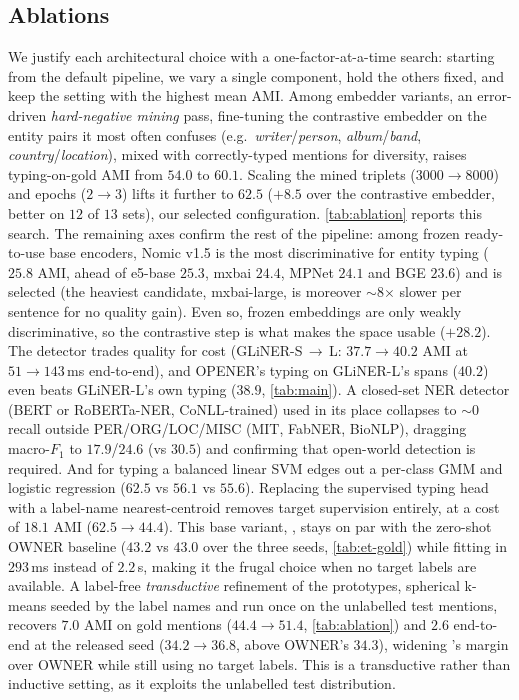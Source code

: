 \subsection{Ablations}
\label{sec:exp:ablations}
We justify each architectural choice with a one-factor-at-a-time search: starting from the default pipeline, we vary a single component, hold the others fixed, and keep the setting with the highest mean AMI.
Among embedder variants, an error-driven \emph{hard-negative mining} pass, fine-tuning the contrastive embedder on the entity pairs it most often confuses (e.g.\ \emph{writer}/\emph{person}, \emph{album}/\emph{band}, \emph{country}/\emph{location}), mixed with correctly-typed mentions for diversity, raises typing-on-gold AMI from $54.0$ to $60.1$. Scaling the mined triplets ($3000\!\to\!8000$) and epochs ($2\!\to\!3$) lifts it further to $62.5$ ($+8.5$ over the contrastive embedder, better on $12$ of $13$ sets), our selected configuration.
\autoref{tab:ablation} reports this search.
The remaining axes confirm the rest of the pipeline: among frozen ready-to-use base encoders, Nomic v1.5 is the most discriminative for entity typing ($25.8$ AMI, ahead of e5-base $25.3$, mxbai $24.4$, MPNet $24.1$ and BGE $23.6$) and is selected (the heaviest candidate, mxbai-large, is moreover $\sim$8$\times$ slower per sentence for no quality gain). Even so, frozen embeddings are only weakly discriminative, so the contrastive step is what makes the space usable ($+28.2$). The detector trades quality for cost (GLiNER-S\,$\to$\,L: $37.7\!\to\!40.2$ AMI at $51\!\to\!143$\,ms end-to-end), and OPENER's typing on GLiNER-L's spans ($40.2$) even beats GLiNER-L's own typing ($38.9$, \autoref{tab:main}). A closed-set NER detector (BERT or RoBERTa-NER, CoNLL-trained) used in its place collapses to $\sim$0 recall outside PER/ORG/LOC/MISC (MIT, FabNER, BioNLP), dragging macro-$F_1$ to $17.9$/$24.6$ (vs $30.5$) and confirming that open-world detection is required. And for typing a balanced linear SVM edges out a per-class GMM and logistic regression ($62.5$ vs $56.1$ vs $55.6$).
Replacing the supervised typing head with a label-name nearest-centroid removes target supervision entirely, at a cost of $18.1$ AMI ($62.5\!\to\!44.4$). This base variant, \zsind, stays on par with the zero-shot OWNER baseline ($43.2$ vs $43.0$ over the three seeds, \autoref{tab:et-gold}) while fitting in $293$\,ms instead of $2.2$\,s, making it the frugal choice when no target labels are available.
A label-free \emph{transductive} refinement of the prototypes, spherical k-means seeded by the label names and run once on the unlabelled test mentions, recovers $7.0$ AMI on gold mentions ($44.4\!\to\!51.4$, \autoref{tab:ablation}) and $2.6$ end-to-end at the released seed ($34.2\!\to\!36.8$, above OWNER's $34.3$), widening \zstr's margin over OWNER while still using no target labels. This is a transductive rather than inductive setting, as it exploits the unlabelled test distribution.

